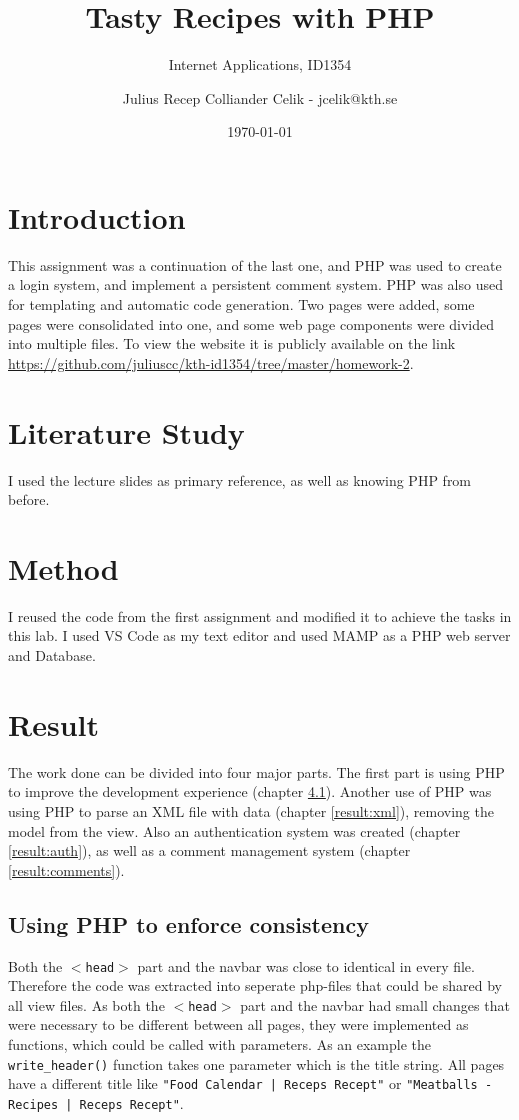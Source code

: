 \documentclass[a4paper]{scrartcl}
\title{Tasty Recipes with PHP}
\subtitle{Internet Applications, ID1354}
\author{Julius Recep Colliander Celik - jcelik@kth.se}
\date{\today}
\begin{document}
\maketitle

\section{Introduction}

This assignment was a continuation of the last one, and PHP was used to create a login system, and implement a persistent comment system. PHP was also used for templating and automatic code generation. Two pages were added, some pages were consolidated into one, and some web page components were divided into multiple files. To view the website it is publicly available on the link \href{https://github.com/juliuscc/kth-id1354/tree/master/homework-2}{https://github.com/juliuscc/kth-id1354/tree/master/homework-2}. 

\section{Literature Study}

I used the lecture slides as primary reference, as well as knowing PHP from before.

\section{Method}

I reused the code from the first assignment and modified it to achieve the tasks in this lab. I used VS Code as my text editor and used MAMP as a PHP web server and Database.

\section{Result}

The work done can be divided into four major parts. The first part is using PHP to improve the development experience (chapter \ref{result:php}). Another use of PHP was using PHP to parse an XML file with data (chapter \ref{result:xml}), removing the model from the view. Also an authentication system was created (chapter \ref{result:auth}), as well as a comment management system (chapter \ref{result:comments}).

\subsection{Using PHP to enforce consistency}
\label{result:php}
Both the \texttt{$<$head$>$} part and the navbar was close to identical in every file. Therefore the code was extracted into seperate php-files that could be shared by all view files. As both the \texttt{$<$head$>$} part and the navbar had small changes that were necessary to be different between all pages, they were implemented as functions, which could be called with parameters. As an example the \texttt{write\_header()} function takes one parameter which is the title string. All pages have a different title like \texttt{"Food Calendar | Receps Recept"} or \texttt{"Meatballs - Recipes | Receps Recept"}.
\end{document}
